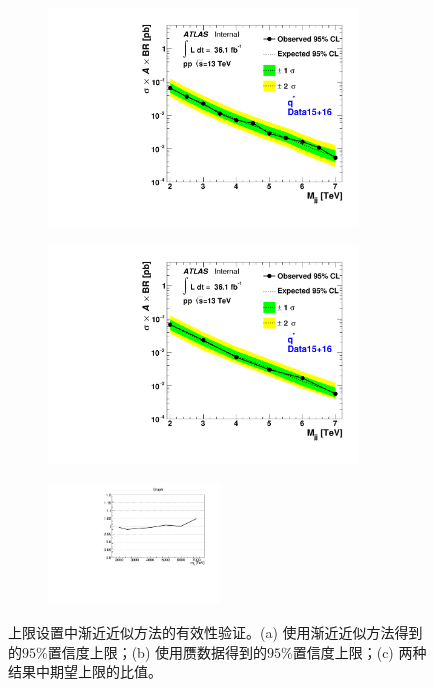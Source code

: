\begin{figure}[!thbp]
  \begin{subfigure}{.5\textwidth}
  \centering
  \includegraphics[width=0.9\textwidth]{figuresDijet/Appendix-HF/dijet_qStar_limit_asy.pdf}
  \caption{}
  \end{subfigure}
  \begin{subfigure}{.5\textwidth}
  \centering
  \includegraphics[width=0.9\textwidth]{figuresDijet/Appendix-HF/dijet_qStar_limit1.pdf}
  \caption{}
  \end{subfigure}
\newline
  \begin{subfigure}{.99\textwidth}
  \centering
  \includegraphics[width=0.5\textwidth]{figuresDijet/Appendix-HF/Ratio.pdf}
  \caption{}
  \end{subfigure}
  \caption{
  上限设置中渐近近似方法的有效性验证。(a) 使用渐近近似方法得到的$95\%$置信度上限；(b) 使用赝数据得到的$95\%$置信度上限；(c) 两种结果中期望上限的比值。
}
\label{fig:HistVal}
\end{figure}

